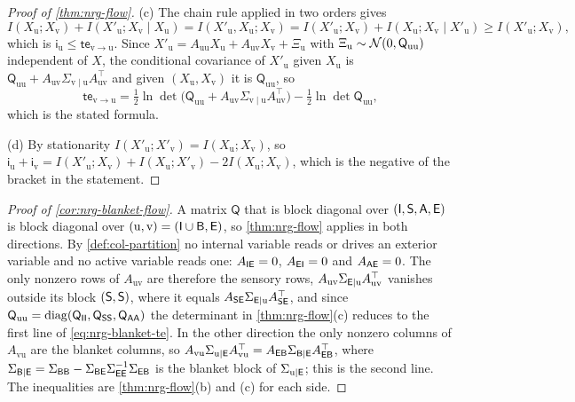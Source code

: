 \begin{proof}[Proof of \cref{thm:nrg-flow}]
(c) The chain rule applied in two orders gives
\[
I(X_{\mathrm u};X_{\mathrm v})+I(X'_{\mathrm u};X_{\mathrm v}\mid X_{\mathrm u})=I(X'_{\mathrm u},X_{\mathrm u};X_{\mathrm v})=I(X'_{\mathrm u};X_{\mathrm v})+I(X_{\mathrm u};X_{\mathrm v}\mid X'_{\mathrm u})\ge I(X'_{\mathrm u};X_{\mathrm v}),
\]
which is $\mathsf i_{\mathrm u}\le\mathsf{te}_{\mathrm v\to\mathrm u}$. Since $X'_{\mathrm u}=A_{\mathrm{uu}}X_{\mathrm u}+A_{\mathrm{uv}}X_{\mathrm v}+\Xi_{\mathrm u}$ with $\Xi_{\mathrm u}\sim\mathcal{N}(0,\mathsf Q_{\mathrm{uu}})$ independent of $X$, the conditional covariance of $X'_{\mathrm u}$ given $X_{\mathrm u}$ is $\mathsf Q_{\mathrm{uu}}+A_{\mathrm{uv}}\Sigma_{\mathrm v\mid\mathrm u}A_{\mathrm{uv}}^\top$ and given $(X_{\mathrm u},X_{\mathrm v})$ it is $\mathsf Q_{\mathrm{uu}}$, so
\[
\mathsf{te}_{\mathrm v\to\mathrm u}=\tfrac12\ln\det\bigl(\mathsf Q_{\mathrm{uu}}+A_{\mathrm{uv}}\Sigma_{\mathrm v\mid\mathrm u}A_{\mathrm{uv}}^\top\bigr)-\tfrac12\ln\det\mathsf Q_{\mathrm{uu}},
\]
which is the stated formula.

(d) By stationarity $I(X'_{\mathrm u};X'_{\mathrm v})=I(X_{\mathrm u};X_{\mathrm v})$, so $\mathsf i_{\mathrm u}+\mathsf i_{\mathrm v}=I(X'_{\mathrm u};X_{\mathrm v})+I(X_{\mathrm u};X'_{\mathrm v})-2I(X_{\mathrm u};X_{\mathrm v})$, which is the negative of the bracket in the statement.
\end{proof}

\begin{proof}[Proof of \cref{cor:nrg-blanket-flow}]
A matrix $\mathsf Q$ that is block diagonal over $(\mathsf{I},\mathsf{S},\mathsf{A},\mathsf{E})$ is block diagonal over $(\mathrm u,\mathrm v)=(\mathsf{I}\cup\mathsf{B},\mathsf{E})$, so \cref{thm:nrg-flow} applies in both directions. By \cref{def:col-partition} no internal variable reads or drives an exterior variable and no active variable reads one: $A_{\mathsf{I}\mathsf{E}}=0$, $A_{\mathsf{E}\mathsf{I}}=0$ and $A_{\mathsf{A}\mathsf{E}}=0$. The only nonzero rows of $A_{\mathrm{uv}}$ are therefore the sensory rows, $A_{\mathrm{uv}}\Sigma_{\mathsf{E}\mid\mathrm u}A_{\mathrm{uv}}^\top$ vanishes outside its block $(\mathsf{S},\mathsf{S})$, where it equals $A_{\mathsf{S}\mathsf{E}}\Sigma_{\mathsf{E}\mid\mathrm u}A_{\mathsf{S}\mathsf{E}}^\top$, and since $\mathsf Q_{\mathrm{uu}}=\operatorname{diag}(\mathsf Q_{\mathsf{I}\mathsf{I}},\mathsf Q_{\mathsf{S}\mathsf{S}},\mathsf Q_{\mathsf{A}\mathsf{A}})$ the determinant in \cref{thm:nrg-flow}(c) reduces to the first line of \cref{eq:nrg-blanket-te}. In the other direction the only nonzero columns of $A_{\mathrm{vu}}$ are the blanket columns, so $A_{\mathrm{vu}}\Sigma_{\mathrm u\mid\mathsf{E}}A_{\mathrm{vu}}^\top=A_{\mathsf{E}\mathsf{B}}\Sigma_{\mathsf{B}\mid\mathsf{E}}A_{\mathsf{E}\mathsf{B}}^\top$, where $\Sigma_{\mathsf{B}\mid\mathsf{E}}=\Sigma_{\mathsf{B}\mathsf{B}}-\Sigma_{\mathsf{B}\mathsf{E}}\Sigma_{\mathsf{E}\mathsf{E}}^{-1}\Sigma_{\mathsf{E}\mathsf{B}}$ is the blanket block of $\Sigma_{\mathrm u\mid\mathsf{E}}$; this is the second line. The inequalities are \cref{thm:nrg-flow}(b) and (c) for each side.
\end{proof}

